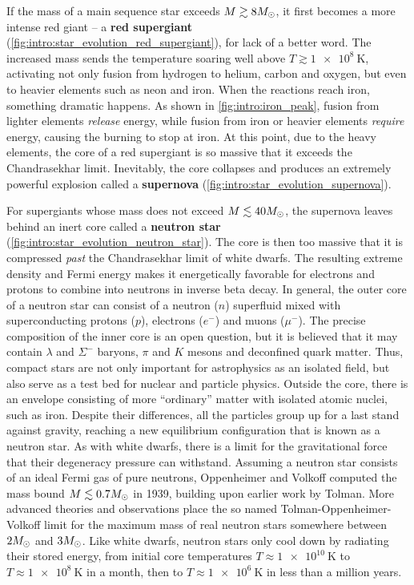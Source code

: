 If the mass of a main sequence star exceeds $M \gtrsim 8 M_\odot$, it first becomes a more intense red giant -- a \textbf{red supergiant} (\cref{fig:intro:star_evolution_red_supergiant}), for lack of a better word.
The increased mass sends the temperature soaring well above $T \gtrsim \SI{1e8}{\kelvin}$, activating not only fusion from hydrogen to helium, carbon and oxygen, but even to heavier elements such as neon and iron.
When the reactions reach iron, something dramatic happens.
As shown in \cref{fig:intro:iron_peak}, fusion from lighter elements \emph{release} energy, while fusion from iron or heavier elements \emph{require} energy, causing the burning to stop at iron.
At this point, due to the heavy elements, the core of a red supergiant is so massive that it exceeds the Chandrasekhar limit.
Inevitably, the core collapses and produces an extremely powerful explosion called a \textbf{supernova} (\cref{fig:intro:star_evolution_supernova}).

For supergiants whose mass does not exceed $M \lesssim 40 M_\odot$, the supernova leaves behind an inert core called a \textbf{neutron star} (\cref{fig:intro:star_evolution_neutron_star}).
The core is then too massive that it is compressed \emph{past} the Chandrasekhar limit of white dwarfs.
The resulting extreme density and Fermi energy makes it energetically favorable for electrons and protons to combine into neutrons in inverse beta decay.
In general, the outer core of a neutron star can consist of a neutron ($n$) superfluid mixed with superconducting protons ($p$), electrons ($e^-$) and muons ($\mu^-$). %
The precise composition of the inner core is an open question, but it is believed that it may contain $\lambda$ and $\Sigma^-$ baryons, $\pi$ and $K$ mesons and deconfined quark matter. %
Thus, compact stars are not only important for astrophysics as an isolated field, but also serve as a test bed for nuclear and particle physics.
Outside the core, there is an envelope consisting of more ``ordinary'' matter with isolated atomic nuclei, such as iron. %
Despite their differences, all the particles group up for a last stand against gravity, reaching a new equilibrium configuration that is known as a neutron star.
As with white dwarfs, there is a limit for the gravitational force that their degeneracy pressure can withstand.
Assuming a neutron star consists of an ideal Fermi gas of pure neutrons, Oppenheimer and Volkoff computed the mass bound $M \lesssim 0.7 M_\odot$ in 1939, building upon earlier work by Tolman. \cite{ref:tov,ref:tolman}
More advanced theories and observations place the so named Tolman-Oppenheimer-Volkoff limit for the maximum mass of real neutron stars somewhere between $2 M_\odot$ and $3 M_\odot$. %
Like white dwarfs, neutron stars only cool down by radiating their stored energy, from initial core temperatures $T \approx \SI{1e10}{\kelvin}$ to $T \approx \SI{1e8}{\kelvin}$ in a month, then to $T \approx \SI{1e6}{\kelvin}$ in less than a million years. \cite{ref:glendenning} %

